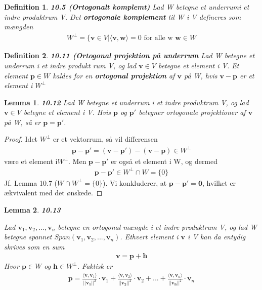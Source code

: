 \documentclass[paper=a4, fontsize=11pt]{scrartcl} %
\newtheorem*{lemma}{Lemma}
\newtheorem*{definition}{Definition}
\newenvironment{cstmlemma}[1]{\begin{lemma} {\normalfont\textbf{#1}}}{\end{lemma}}
\newenvironment{cstmdefinition}[1]{\begin{definition} {\normalfont\textbf{#1}}}{\end{definition}}
\begin{document}
	\begin{cstmdefinition}{10.5 (Ortogonalt komplemt)}
		Lad W betegne et underrumi et indre produktrum V. Det \textbf{ortogonale komplement} til W i V defineres som mængden
		\begin{align*}
			W^\bot =\{\mathbf{v}\in V|\langle\mathbf{v},\mathbf{w}\rangle=0 \text{ for alle w } \mathbf{w}\in W
		\end{align*}
		
	\end{cstmdefinition}
	
	\begin{cstmdefinition}{10.11 (Ortogonal projektion på underrum}
		Lad W betegne et underrum i et indre produkt rum V, og lad $\mathbf{v}\in V$ betegne et element i V. Et element $\mathbf{p}\in W$ kaldes for en \textbf{ortogonal projektion} af $\mathbf{v}$ på W, hvis $\mathbf{v}-\mathbf{p}$ er et element i $W^\bot$
		
	\end{cstmdefinition}
	
	\begin{cstmlemma}{10.12}
		Lad W betegne et underrum i et indre produktrum V, og lad $\mathbf{v}\in V$ betegne et element i V. Hvis $\mathbf{p}$ og $\mathbf{p}'$ betegner ortogonale projektioner af $\mathbf{v}$ på W, så er $\mathbf{p}=\mathbf{p}'$.
	\end{cstmlemma}
	
	\begin{proof}
		Idet $W^\bot$ er et vektorrum, så vil differensen
		\begin{align*}
			\mathbf{p}-\mathbf{p}' =(\mathbf{v}-\mathbf{p}')-(\mathbf{v}-\mathbf{p})\in W^\bot
		\end{align*}
		være et element i$W^\bot$. Men $\mathbf{p}-\mathbf{p}'$ er også et element i W, og dermed
		\begin{align*}
			\mathbf{p}-\mathbf{p}'\in W^\bot \cap W=\{0\}
		\end{align*}
		Jf. Lemma 10.7 ($W\cap W^\bot =\{0\}$). Vi konkluderer, at $\mathbf{p}-\mathbf{p}'=\mathbf{0}$, hvilket er ækvivalent med det ønskede.
	\end{proof}
	
	\begin{cstmlemma}{10.13}
		
		Lad $\mathbf{v}_1,\mathbf{v}_2,...,\mathbf{v}_n$ betegne en ortogonal mængde i et indre produktrum V, og lad W betegne spannet $Span(\mathbf{v}_1,\mathbf{v}_2,...,\mathbf{v}_n)$. Ethvert element i $\mathbf{v}$ i V kan da entydig skrives som en sum
		\begin{align*}
			\mathbf{v}=\mathbf{p}+\mathbf{h}
		\end{align*}
		Hvor $\mathbf{p}\in W$ og $\mathbf{h}\in W^\bot$. Faktisk er 
		\begin{align*}
			\mathbf{p}=\frac{\langle\mathbf{v},\mathbf{v}_1\rangle}{||\mathbf{v_1}||^2}\cdot\mathbf{v}_1+\frac{\langle\mathbf{v},\mathbf{v}_2\rangle}{||\mathbf{v_2}||^2}\cdot\mathbf{v}_2+...+\frac{\langle\mathbf{v},\mathbf{v}_n\rangle}{||\mathbf{v_n}||^2}\cdot\mathbf{v}_n
		\end{align*}
	\end{cstmlemma}
	
\end{document}

